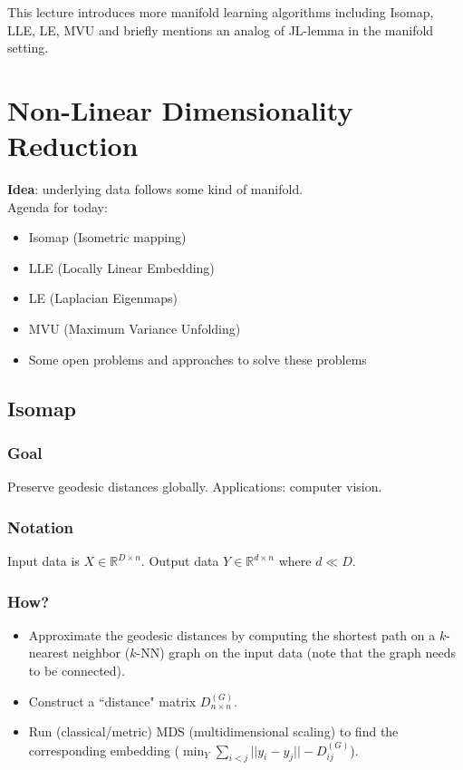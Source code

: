 
This lecture introduces more manifold learning algorithms including
Isomap, LLE, LE, MVU and briefly mentions an analog of JL-lemma in the
manifold setting. 

\section{Non-Linear Dimensionality Reduction}
\textbf{Idea}: underlying data follows some kind of manifold.\\
Agenda for today:
\begin{itemize}
\item Isomap (Isometric mapping)
\item LLE (Locally Linear Embedding)
\item LE (Laplacian Eigenmaps)
\item MVU (Maximum Variance Unfolding)
\item Some open problems and approaches to solve these problems
\end{itemize}

\subsection{Isomap}
\subsubsection*{Goal}
Preserve geodesic distances globally. Applications: computer vision. 

\subsubsection*{Notation}
Input data is $X \in \mathbb{R}^{D\times n}$. Output data $Y \in
\mathbb{R}^{d\times n}$ where $d\ll D$. 

\subsubsection*{How?}
\begin{itemize}
\item Approximate the geodesic distances by computing the shortest
  path on a $k$-nearest neighbor ($k$-NN) graph on the input data
  (note that the graph needs to be connected). 
\item Construct a ``distance" matrix $D^{(G)}_{n\times n}$.
\item Run (classical/metric) MDS (multidimensional scaling) to find
  the corresponding embedding ($\min_{Y} \sum_{i<j}||y_i - y_j|| -
  D^{(G)}_{ij}$). 
\end{itemize}

